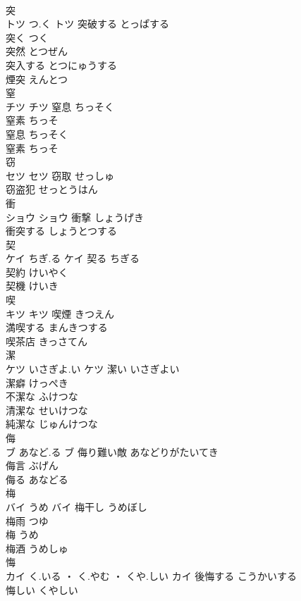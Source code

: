 \documentclass[8pt]{extreport}
\begin{document}
\begin{CJK}{UTF8}{min}
\\	突	
\\	トツ	つ.く	トツ	突破する	とっぱする	
\\	突く	つく	
\\	突然	とつぜん	
\\	突入する	とつにゅうする	
\\	煙突	えんとつ	
\\	窒	
\\	チツ		チツ	窒息	ちっそく	
\\	窒素	ちっそ	
\\	窒息	ちっそく	
\\	窒素	ちっそ	
\\	窃	
\\	セツ		セツ	窃取	せっしゅ	
\\	窃盗犯	せっとうはん	
\\	衝	
\\	ショウ		ショウ	衝撃	しょうげき	
\\	衝突する	しょうとつする	
\\	契	
\\	ケイ	ちぎ.る	ケイ	契る	ちぎる	
\\	契約	けいやく	
\\	契機	けいき	
\\	喫	
\\	キツ		キツ	喫煙	きつえん	
\\	満喫する	まんきつする	
\\	喫茶店	きっさてん	
\\	潔	
\\	ケツ	いさぎよ.い	ケツ	潔い	いさぎよい	
\\	潔癖	けっぺき	
\\	不潔な	ふけつな	
\\	清潔な	せいけつな	
\\	純潔な	じゅんけつな	
\\	侮	
\\	ブ	あなど.る	ブ	侮り難い敵	あなどりがたいてき	
\\	侮言	ぶげん	
\\	侮る	あなどる	
\\	梅	
\\	バイ	うめ	バイ	梅干し	うめぼし	
\\	梅雨	つゆ	
\\	梅	うめ	
\\	梅酒	うめしゅ	
\\	悔	
\\	カイ	く.いる ・ く.やむ ・ くや.しい	カイ	後悔する	こうかいする	
\\	悔しい	くやしい	

\end{CJK}
\end{document}
